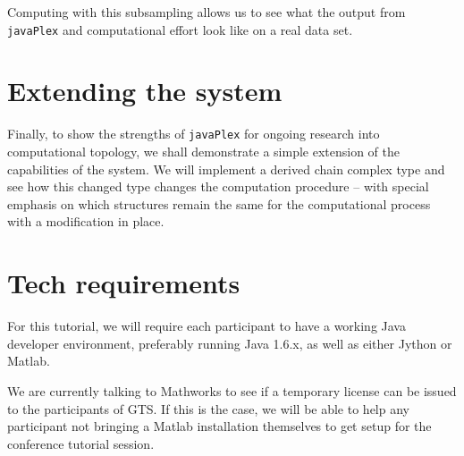 \documentclass{amsart}
\newcommand\javaPlex{\texttt{javaPlex}\xspace}
\begin{document}
Computing with this subsampling allows us to see what the output from \javaPlex and computational effort look like on a real data set. 

\section{Extending the system}
\label{sec:extending-system}

Finally, to show the strengths of \javaPlex for ongoing research into computational topology, we shall demonstrate a simple extension of the capabilities of the system. We will implement a derived chain complex type and see how this changed type changes the computation procedure -- with special emphasis on which structures remain the same for the computational process with a modification in place.

\section{Tech requirements}
\label{sec:tech-requirements}

For this tutorial, we will require each participant to have a working Java developer environment, preferably running Java 1.6.x, as well as either Jython or Matlab.

We are currently talking to Mathworks to see if a temporary license can be issued to the participants of GTS. If this is the case, we will be able to help any participant not bringing a Matlab installation themselves to get setup for the conference tutorial session. 
\end{document}
